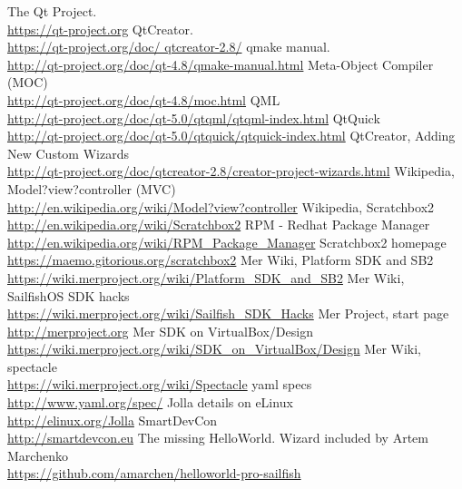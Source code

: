 \begin{thebibliography}{xxxxxxxxxxxx}
%
%
 The Qt Project. \\\url{https://qt-project.org}
 QtCreator. \\\url{https://qt-project.org/doc/
qtcreator-2.8/}
 qmake manual. \\\url{http://qt-project.org/doc/qt-4.8/qmake-manual.html}
 Meta-Object Compiler (MOC) \\\url{http://qt-project.org/doc/qt-4.8/moc.html}
 QML \\\url{http://qt-project.org/doc/qt-5.0/qtqml/qtqml-index.html}
 QtQuick \\\url{http://qt-project.org/doc/qt-5.0/qtquick/qtquick-index.html}
 QtCreator, Adding New Custom Wizards\\\url{http://qt-project.org/doc/qtcreator-2.8/creator-project-wizards.html}
%
%
 Wikipedia, Model?view?controller (MVC) \\\url{http://en.wikipedia.org/wiki/Model?view?controller}
 Wikipedia, Scratchbox2 \\\url{http://en.wikipedia.org/wiki/Scratchbox2}
 RPM - Redhat Package Manager \\\url{http://en.wikipedia.org/wiki/RPM_Package_Manager}
%
%
 Scratchbox2 homepage \\\url{https://maemo.gitorious.org/scratchbox2}
%
%
 Mer Wiki, Platform SDK and SB2 \\\url{https://wiki.merproject.org/wiki/Platform_SDK_and_SB2}
 Mer Wiki, SailfishOS SDK hacks \\\url{https://wiki.merproject.org/wiki/Sailfish_SDK_Hacks}
 Mer Project, start page \\\url{http://merproject.org}
 Mer SDK on VirtualBox/Design \url{https://wiki.merproject.org/wiki/SDK_on_VirtualBox/Design}
 Mer Wiki, spectacle \\\url{https://wiki.merproject.org/wiki/Spectacle}
%
%
 yaml specs \\\url{http://www.yaml.org/spec/}
%
%
 Jolla details on eLinux \\\url{http://elinux.org/Jolla}
%
%
 SmartDevCon \\\url{http://smartdevcon.eu}
%
%
 The missing HelloWorld. Wizard included by Artem Marchenko \\\url{https://github.com/amarchen/helloworld-pro-sailfish}

\end{thebibliography}
